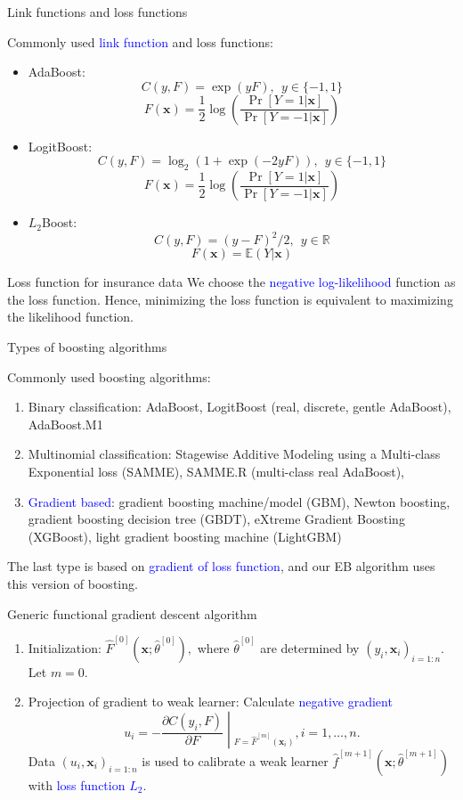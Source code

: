 \documentclass[professionalfont]{beamer}
\newcounter{saveenumi}
\newcommand{\seti}{\setcounter{saveenumi}{\value{enumi}}}
\def\R{{\mathbb R}}  %
\def\E{{\mathbb E}}  %
\def\bx{\boldsymbol{x}}
\newcommand{\blue}[1]{\textcolor{blue}{#1}}
\begin{document}
\begin{frame}{Link functions and loss functions}

	Commonly used \blue{link function} and loss functions:
	\begin{itemize}
		\item AdaBoost: $$C(y,F)=\exp(yF),  ~~ y\in\{-1,1\}$$
		$$F(\bx)=\frac{1}{2}\log\left(\frac{\Pr[Y=1|\bx]}{\Pr[Y=-1|\bx]}\right)$$
		\item LogitBoost: $$C(y,F)=\log_2(1+\exp(-2yF)), ~~ y\in\{-1,1\}$$
		$$F(\bx)=\frac{1}{2}\log\left(\frac{\Pr[Y=1|\bx]}{\Pr[Y=-1|\bx]}\right)$$
		\item $L_2$Boost: $$C(y,F)=(y-F)^2/2, ~~ y\in \R$$
		$$F(\bx)=\E(Y|\bx)$$
	\end{itemize}
\end{frame}

\begin{frame}{Loss function for insurance data}
	We choose the \blue{negative log-likelihood} function as the loss function. Hence, minimizing the loss function is equivalent to maximizing the likelihood function.
\end{frame}

\begin{frame}{Types of boosting algorithms}

Commonly used boosting algorithms:
	\begin{enumerate}

		\item Binary classification: {AdaBoost}, LogitBoost (real, discrete, gentle AdaBoost), AdaBoost.M1

		\item Multinomial classification: Stagewise Additive Modeling using a Multi-class Exponential loss (SAMME), SAMME.R (multi-class real AdaBoost),
		\item \blue{Gradient based}: {gradient boosting machine/model (GBM)}, Newton boosting, gradient boosting decision tree (GBDT), {eXtreme Gradient Boosting (XGBoost)}, {light gradient boosting machine (LightGBM)}
	\end{enumerate}

The last type is based on \blue{gradient of loss function}, and our EB algorithm uses this version of boosting.
\end{frame}

\begin{frame}{Generic functional gradient descent algorithm}
	\begin{enumerate}
		\item Initialization: $\hat{F}^{[0]}(\bx;\hat{\theta}^{[0]}),$ where $\hat{\theta}^{[0]}$ are determined by $(y_i,\bx_i)_{i=1:n}$.
		Let $m=0.$
		\item Projection of gradient to weak learner:
		Calculate \blue{negative gradient} $$u_i=\left.-\frac{\partial C(y_i,F)}{\partial F}\middle|_{F=\hat{F}^{[m]}(\bx_i)}\right., i=1,\ldots,n.$$
		Data $(u_i,\bx_i)_{i=1:n}$ is used to calibrate a weak learner $\hat{f}^{[m+1]}(\bx;\hat{\theta}^{[m+1]})$ with \blue{loss function $L_2$}.
		\seti
\end{enumerate}
\end{frame}
\end{document}
